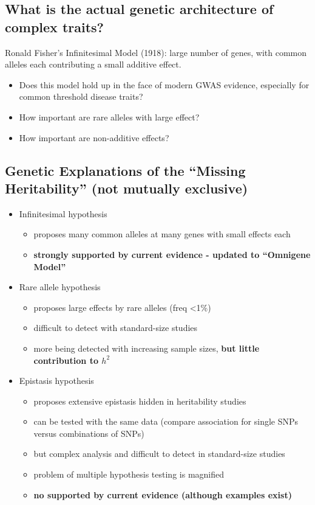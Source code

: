 \documentclass[10pt]{article}
\begin{document}
\subsection*{What is the actual genetic architecture of complex traits?}
Ronald Fisher's Infinitesimal Model (1918): large number of genes, with common alleles each contributing a small additive effect.
\begin{itemize}
	\item Does this model hold up in the face of modern GWAS evidence, especially for common threshold disease traits?
	\item How important are rare alleles with large effect?
	\item How important are non-additive effects?
\end{itemize}

\subsection*{Genetic Explanations of the ``Missing Heritability'' (not mutually exclusive)}
\begin{itemize}
	\item Infinitesimal hypothesis
	\begin{itemize}
	    \item proposes many common alleles at many genes with small effects each
	    \item \textbf{strongly supported by current evidence - updated to ``Omnigene Model''}
    \end{itemize}
	\item Rare allele hypothesis
	\begin{itemize}
	    \item proposes large effects by rare alleles (freq <1\%)
	    \item difficult to detect with standard-size studies
	    \item more being detected with increasing sample sizes, \textbf{but little contribution to $h^2$}
    \end{itemize}
	\item Epistasis hypothesis
	\begin{itemize}
	    \item proposes extensive epistasis hidden in heritability studies
	    \item can be tested with the same data (compare association for single SNPs versus combinations of SNPs)
	    \item but complex analysis and difficult to detect in standard-size studies
	    \item problem of multiple hypothesis testing is magnified
	    \item \textbf{no supported by current evidence (although examples exist)}
    \end{itemize}
\end{itemize}
\end{document}
